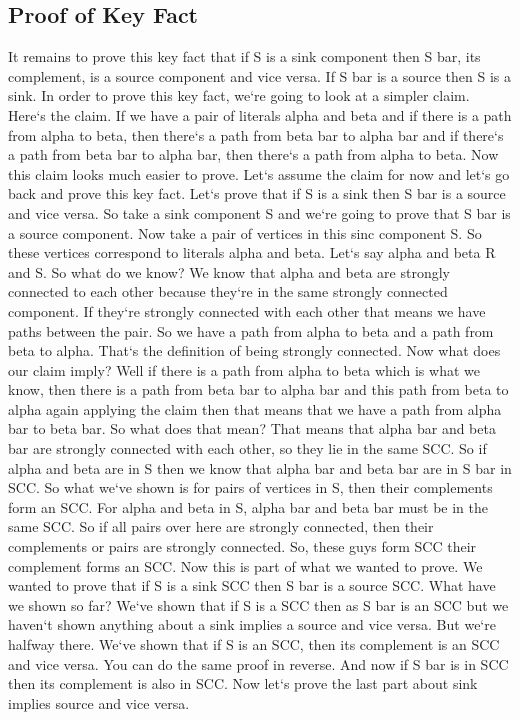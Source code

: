\subsection{Proof of Key Fact}
It remains to prove this key fact that if S is a sink component then S bar, its complement, is a source component and vice versa.
If S bar is a source then S is a sink.
In order to prove this key fact, we`re going to look at a simpler claim.
Here`s the claim.
If we have a pair of literals alpha and beta and if there is a path from alpha to beta, then there`s a path from beta bar to alpha bar and if there`s a path from beta bar to alpha bar, then there`s a path from alpha to beta.
Now this claim looks much easier to prove.
Let`s assume the claim for now and let`s go back and prove this key fact.
Let`s prove that if S is a sink then S bar is a source and vice versa.
So take a sink component S and we`re going to prove that S bar is a source component.
Now take a pair of vertices in this sinc component S\@.
So these vertices correspond to literals alpha and beta.
Let`s say alpha and beta R and S\@.
So what do we know? We know that alpha and beta are strongly connected to each other because they`re in the same strongly connected component.
If they`re strongly connected with each other that means we have paths between the pair.
So we have a path from alpha to beta and a path from beta to alpha.
That`s the definition of being strongly connected.
Now what does our claim imply? Well if there is a path from alpha to beta which is what we know, then there is a path from beta bar to alpha bar and this path from beta to alpha again applying the claim then that means that we have a path from alpha bar to beta bar.
So what does that mean? That means that alpha bar and beta bar are strongly connected with each other, so they lie in the same SCC\@.
So if alpha and beta are in S then we know that alpha bar and beta bar are in S bar in SCC\@.
So what we`ve shown is for pairs of vertices in S, then their complements form an SCC\@.
For alpha and beta in S, alpha bar and beta bar must be in the same SCC\@.
So if all pairs over here are strongly connected, then their complements or pairs are strongly connected.
So, these guys form SCC their complement forms an SCC\@.
Now this is part of what we wanted to prove.
We wanted to prove that if S is a sink SCC then S bar is a source SCC\@.
What have we shown so far? We`ve shown that if S is a SCC then as S bar is an SCC but we haven`t shown anything about a sink implies a source and vice versa.
But we`re halfway there.
We`ve shown that if S is an SCC, then its complement is an SCC and vice versa.
You can do the same proof in reverse.
And now if S bar is in SCC then its complement is also in SCC\@.
Now let`s prove the last part about sink implies source and vice versa.

